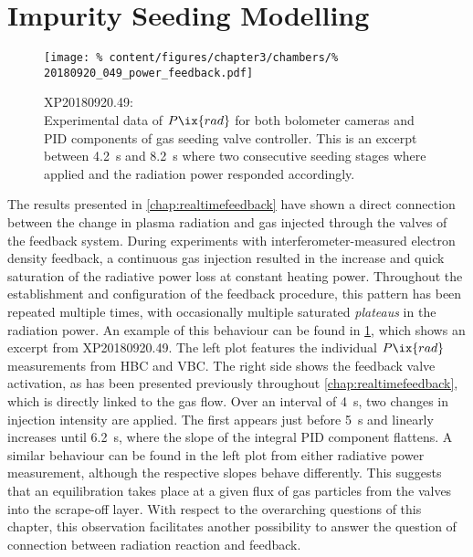     \section{Impurity Seeding Modelling}\label{sec:seedmodel}%
%
        \begin{figure}[t]%
            \centering%
            \texttt{[image: \%
                content/figures/chapter3/chambers/\%
                20180920\_049\_power\_feedback.pdf]}%
            \caption{XP20180920.49:\\%
                Experimental data of $P\ix{rad}$ for both bolometer cameras and PID components of gas seeding valve controller. This is an excerpt between \SI{4.2}{\second} and \SI{8.2}{\second} where two consecutive seeding stages where applied and the radiation power responded accordingly.}\label{fig:chamber_expdata}%
        \end{figure}%
%
        The results presented in \cref{chap:realtimefeedback} have shown a direct connection between the change in plasma radiation and gas injected through the valves of the feedback system. During experiments with interferometer-measured electron density feedback, a continuous gas injection resulted in the increase and quick saturation of the radiative power loss at constant heating power. Throughout the establishment and configuration of the feedback procedure, this pattern has been repeated multiple times, with occasionally multiple saturated \textit{plateaus} in the radiation power. An example of this behaviour can be found in \cref{fig:chamber_expdata}, which shows an excerpt from XP20180920.49. The left plot features the individual $P\ix{rad}$ measurements from HBC and VBC. The right side shows the feedback valve activation, as has been presented previously throughout \cref{chap:realtimefeedback}, which is directly linked to the gas flow. Over an interval of \SI{4}{\second}, two changes in injection intensity are applied. The first appears just before \SI{5}{\second} and linearly increases until \SI{6.2}{\second}, where the slope of the integral PID component flattens. A similar behaviour can be found in the left plot from either radiative power measurement, although the respective slopes behave differently. This suggests that an equilibration takes place at a given flux of gas particles from the valves into the scrape-off layer. With respect to the overarching questions of this chapter, this observation facilitates another possibility to answer the question of connection between radiation reaction and feedback.\\%
%
